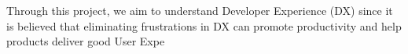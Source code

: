 \documentclass[]{beamer}
\begin{document}
\begin{frame}[fragile]
\begin{markdown}
\small

Through this project, we aim to understand Developer Experience (DX) since it is believed that \textcolor{vsyellow}{eliminating frustrations in DX can promote productivity} \cite{mullerStuckFrustratedFlow2015} and help products \cite{sommervilleSoftwareEngineering1992} deliver good User Expe
\end{markdown}
\end{frame}
\end{document}
